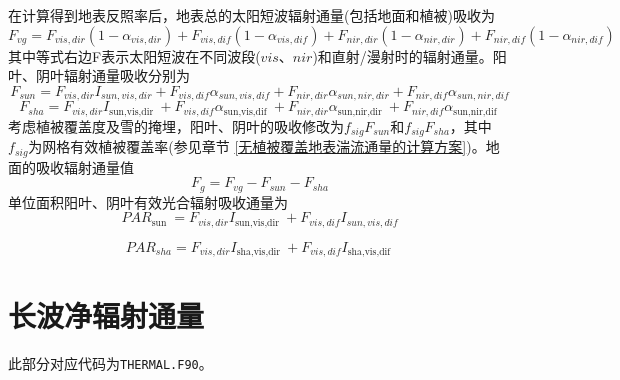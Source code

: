 在计算得到地表反照率后，地表总的太阳短波辐射通量(包括地面和植被)吸收为
\begin{equation}
F_{v g}=F_{vis,dir}\left(1-\alpha_{vis,dir}\right)+F_{vis,dif}\left(1-\alpha_{vis,dif}\right)+
F_{nir,dir}\left(1-\alpha_{nir,dir}\right)+F_{nir,dif}\left(1-\alpha_{nir,dif}\right)
\end{equation}
其中等式右边F表示太阳短波在不同波段($vis$、$nir$)和直射/漫射时的辐射通量。阳叶、阴叶辐射通量吸收分别为
\begin{equation}
F_{s u n}=F_{vi s, dir} I_{s u n, vi s, dir}+F_{vis, dif} \alpha_{s u n, vis, dif}+F_{ni r, dir} \alpha_{s u n, ni r, dir}+F_{nir, dif} \alpha_{s u n, nir, dif}
\end{equation}
\begin{equation}
F_{s h a}=F_{vi s, dir} I_{\text {sun,vis,dir }}+F_{vis, dif} \alpha_{\text {sun,vis,dif }}+F_{ni r, dir} \alpha_{\text {sun,nir,dir }}+F_{nir, dif} \alpha_{\text {sun,nir,dif }}
\end{equation}
考虑植被覆盖度及雪的掩埋，阳叶、阴叶的吸收修改为$f_{sig}F_{sun}$和$f_{sig}F_{sha}$，其中$f_{sig}$为网格有效植被覆盖率(参见章节 \ref{无植被覆盖地表湍流通量的计算方案})。地面的吸收辐射通量值
\begin{equation}
F_{g}=F_{v g}-F_{s u n}-F_{s h a}
\end{equation}
单位面积阳叶、阴叶有效光合辐射吸收通量为
\begin{equation}
P A R_{\text {sun }}=F_{vi s, dir} I_{\text {sun,vis,dir }}+F_{vis, dif} I_{s u n, vis, dif}
\end{equation}

\begin{equation}
P A R_{s h a}=F_{vi s, dir} I_{\text {sha,vis,dir }}+F_{vis, dif} I_{\text {sha,vis,dif }}
\end{equation}


\section{长波净辐射通量}\label{长波净辐射通量}
此部分对应代码为\texttt{THERMAL.F90}。

